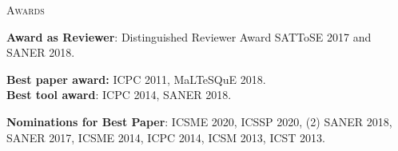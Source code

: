 \documentclass[12pt]{article}
\begin{document}
\vspace{6.5mm}

\textsc{Awards}
\vspace{3.5mm}

\textbf{Award as Reviewer}: Distinguished Reviewer Award SATToSE 2017 and SANER 2018.


\textbf{Best paper award:} ICPC 2011, MaLTeSQuE 2018.\\ 
\textbf{Best tool award}: ICPC 2014, SANER 2018. 

\vspace{1.5mm}

\textbf{Nominations for Best Paper}: ICSME 2020, ICSSP 2020, (2) SANER 2018, SANER 2017, ICSME 2014, ICPC 2014, ICSM 2013, ICST 2013.
\end{document}
